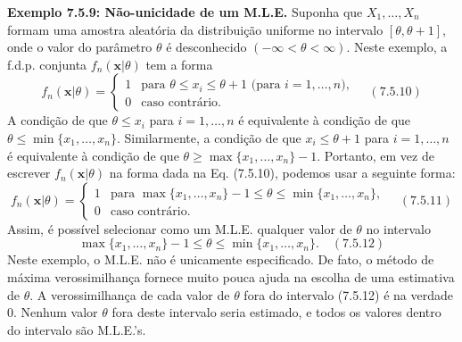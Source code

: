 \textbf{Exemplo 7.5.9: Não-unicidade de um M.L.E.} Suponha que $X_1, \dots, X_n$ formam uma amostra aleatória da distribuição uniforme no intervalo $[\theta, \theta+1]$, onde o valor do parâmetro $\theta$ é desconhecido $(-\infty < \theta < \infty)$. Neste exemplo, a f.d.p. conjunta $f_n(\textbf{x}|\theta)$ tem a forma
$$ f_n(\textbf{x}|\theta) = \begin{cases} 1 & \text{para } \theta \le x_i \le \theta+1 \text{ (para } i=1, \dots, n), \\ 0 & \text{caso contrário}. \end{cases} \quad (7.5.10) $$
A condição de que $\theta \le x_i$ para $i=1, \dots, n$ é equivalente à condição de que $\theta \le \min\{x_1, \dots, x_n\}$. Similarmente, a condição de que $x_i \le \theta+1$ para $i=1, \dots, n$ é equivalente à condição de que $\theta \ge \max\{x_1, \dots, x_n\} - 1$. Portanto, em vez de escrever $f_n(\textbf{x}|\theta)$ na forma dada na Eq. (7.5.10), podemos usar a seguinte forma:
$$ f_n(\textbf{x}|\theta) = \begin{cases} 1 & \text{para } \max\{x_1, \dots, x_n\} - 1 \le \theta \le \min\{x_1, \dots, x_n\}, \\ 0 & \text{caso contrário}. \end{cases} \quad (7.5.11) $$
Assim, é possível selecionar como um M.L.E. qualquer valor de $\theta$ no intervalo
$$ \max\{x_1, \dots, x_n\} - 1 \le \theta \le \min\{x_1, \dots, x_n\}. \quad (7.5.12) $$
Neste exemplo, o M.L.E. não é unicamente especificado. De fato, o método de máxima verossimilhança fornece muito pouca ajuda na escolha de uma estimativa de $\theta$. A verossimilhança de cada valor de $\theta$ fora do intervalo (7.5.12) é na verdade 0. Nenhum valor $\theta$ fora deste intervalo seria estimado, e todos os valores dentro do intervalo são M.L.E.'s.

\vspace{\baselineskip}

